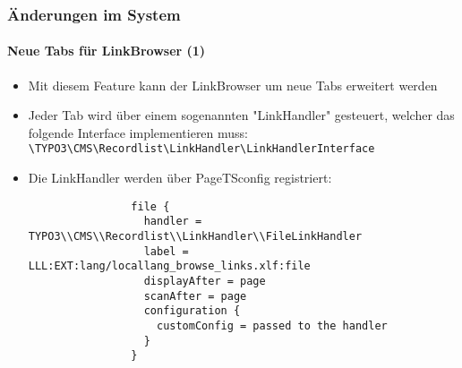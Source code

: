 \begin{frame}[fragile]
	\frametitle{Änderungen im System}
	\framesubtitle{Neue Tabs für LinkBrowser (1)}

	\lstset{basicstyle=\tiny\ttfamily}

	\begin{itemize}

		\item Mit diesem Feature kann der LinkBrowser um neue Tabs erweitert werden

		\item Jeder Tab wird über einem sogenannten "LinkHandler" gesteuert, welcher das
			folgende Interface implementieren muss:\newline
			\small
				\texttt{\textbackslash TYPO3\textbackslash CMS\textbackslash Recordlist\textbackslash LinkHandler\textbackslash LinkHandlerInterface}
			\normalsize

		\item Die LinkHandler werden über PageTSconfig registriert:

			\begin{lstlisting}
				file {
				  handler = TYPO3\\CMS\\Recordlist\\LinkHandler\\FileLinkHandler
				  label = LLL:EXT:lang/locallang_browse_links.xlf:file
				  displayAfter = page
				  scanAfter = page
				  configuration {
				    customConfig = passed to the handler
				  }
				}
			\end{lstlisting}

	\end{itemize}

\end{frame}


